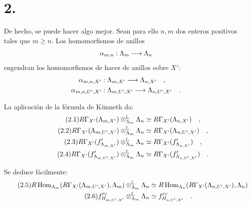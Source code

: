\section*{2.}
De hecho, se puede hacer algo mejor. Sean para ello $n,m$ dos enteros positivos tales que $m \geq n$. Los homomorfismos de anillos
\[
\alpha_{m,n} : \Lambda_m \longrightarrow \Lambda_n
\]
engendran los homomorfismos de haces de anillos sobre $X'$:
\begin{align*}
\alpha_{m,n,X'} &: \Lambda_{m,X'} \longrightarrow \Lambda_{n,X'} \quad , \\
\alpha_{m,n,U',X'} &: \Lambda_{m,U',X'} \longrightarrow \Lambda_{n,U',X'} \quad .
\end{align*}

La aplicación de la fórmula de Künneth da:
\begin{align}
\tag{2.1} R\Gamma_{X'}(\Lambda_{m,X'}) \otimes_{\Lambda_m}^{\mathbb{L}} \Lambda_n &\simeq R\Gamma_{X'}(\Lambda_{n,X'}) \quad , \\
\tag{2.2} R\Gamma_{X'}(\Lambda_{m,U',X'}) \otimes_{\Lambda_m}^{\mathbb{L}} \Lambda_n &\simeq R\Gamma_{X'}(\Lambda_{n,U',X'}) \quad , \\
\tag{2.3} R\Gamma_{X'}(f'_{\Lambda_{m,X'}}) \otimes_{\Lambda_m}^{\mathbb{L}} \Lambda_n &\simeq R\Gamma_{X'}(f'_{\Lambda_{n,X'}}) \quad , \\
\tag{2.4} R\Gamma_{X'}(f'_{\Lambda_{m,U',X'}}) \otimes_{\Lambda_m}^{\mathbb{L}} \Lambda_n &\simeq R\Gamma_{X'}(f'_{\Lambda_{n,U',X'}}) \quad .
\end{align}

Se deduce fácilmente:
\begin{align}
\tag{2.5} R\operatorname{Hom}_{\Lambda_m}(R\Gamma_{X'}(\Lambda_{m,U',X'}), \Lambda_m) \otimes_{\Lambda_m}^{\mathbb{L}} \Lambda_n &\simeq R\operatorname{Hom}_{\Lambda_n}(R\Gamma_{X'}(\Lambda_{n,U',X'}), \Lambda_n) \\
\tag{2.6} f'^\vee_{H_{m,U',X'}} \otimes_{\Lambda_m}^{\mathbb{L}} \Lambda_n &\simeq f'^\vee_{H_{n,U',X'}} \quad .
\end{align}
